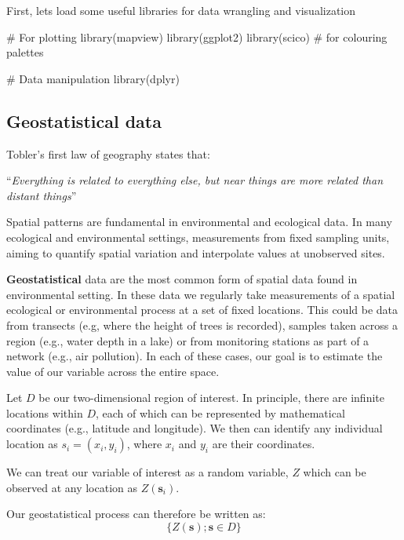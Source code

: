 \documentclass[
  letterpaper,
  DIV=11,
  numbers=noendperiod]{scrartcl}
\newenvironment{Shaded}{\begin{snugshade}}{\end{snugshade}}
\newcommand{\CommentTok}[1]{\textcolor[rgb]{0.37,0.37,0.37}{#1}}
\newcommand{\FunctionTok}[1]{\textcolor[rgb]{0.28,0.35,0.67}{#1}}
\newcommand{\NormalTok}[1]{\textcolor[rgb]{0.00,0.23,0.31}{#1}}
\begin{document}
First, lets load some useful libraries for data wrangling and
visualization

\begin{Shaded}
\begin{Highlighting}[]
\CommentTok{\# For plotting}
\FunctionTok{library}\NormalTok{(mapview)}
\FunctionTok{library}\NormalTok{(ggplot2)}
\FunctionTok{library}\NormalTok{(scico) }\CommentTok{\# for colouring palettes}

\CommentTok{\# Data manipulation}
\FunctionTok{library}\NormalTok{(dplyr)}
\end{Highlighting}
\end{Shaded}

\subsection{Geostatistical data}\label{geostatistical-data}

Tobler's first law of geography states that:

``\emph{Everything is related to everything else, but near things are
more related than distant things}''

Spatial patterns are fundamental in environmental and ecological data.
In many ecological and environmental settings, measurements from fixed
sampling units, aiming to quantify spatial variation and interpolate
values at unobserved sites.

\textbf{Geostatistical} data are the most common form of spatial data
found in environmental setting. In these data we regularly take
measurements of a spatial ecological or environmental process at a set
of fixed locations. This could be data from transects (e.g, where the
height of trees is recorded), samples taken across a region (e.g., water
depth in a lake) or from monitoring stations as part of a network (e.g.,
air pollution). In each of these cases, our goal is to estimate the
value of our variable across the entire space.

Let \(D\) be our two-dimensional region of interest. In principle, there
are infinite locations within \(D\), each of which can be represented by
mathematical coordinates (e.g., latitude and longitude). We then can
identify any individual location as \(s_i = (x_i, y_i)\), where \(x_i\)
and \(y_i\) are their coordinates.

We can treat our variable of interest as a random variable, \(Z\) which
can be observed at any location as \(Z(\mathbf{s}_i)\).

Our geostatistical process can therefore be written as:
\[\{Z(\mathbf{s}); \mathbf{s} \in D\}\]
\end{document}
